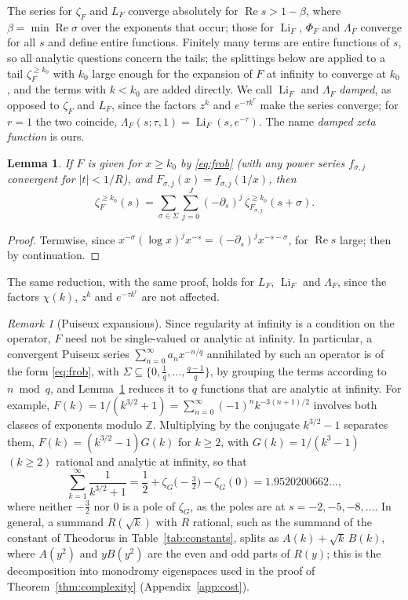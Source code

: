 \documentclass[11pt,reqno]{amsart}
\newtheorem{lemma}[theorem]{Lemma}
\theoremstyle{definition}
\theoremstyle{remark}
\newtheorem{remark}[theorem]{Remark}
\newcommand{\Li}{\operatorname{Li}}
\newcommand{\ZZ}{\mathbb{Z}}
\begin{document}
The series for $\zeta_F$ and $L_F$ converge absolutely for $\operatorname{Re}s > 1 - \beta$, where
$\beta = \min\operatorname{Re}\sigma$ over the exponents that occur; those for $\Li_F$, $\Phi_F$ and $\Lambda_F$
converge for all $s$ and define entire functions. Finitely many terms are entire functions of $s$, so all
analytic questions concern the tails; the splittings below are applied to a tail $\zeta_F^{\ge k_0}$ with $k_0$ large
enough for the expansion of $F$ at infinity to converge at $k_0$, and the terms with $k < k_0$ are added directly. We call $\Li_F$ and $\Lambda_F$ \emph{damped}, as opposed to
$\zeta_F$ and $L_F$, since the factors $z^k$ and $e^{-\tau k^r}$ make the series converge; for $r = 1$ the two
coincide, $\Lambda_F(s;\tau,1) = \Li_F(s,e^{-\tau})$. The name \emph{damped zeta function} is ours.

\begin{lemma}\label{lem:reduction}
If $F$ is given for $x \ge k_0$ by \eqref{eq:frob} (with any power series $f_{\sigma,j}$ convergent for
$|t| < 1/R$), and $F_{\sigma,j}(x) = f_{\sigma,j}(1/x)$, then
\[
  \zeta_F^{\ge k_0}(s) = \sum_{\sigma\in\Sigma}\sum_{j=0}^{J}(-\partial_s)^j\,\zeta_{F_{\sigma,j}}^{\ge k_0}(s+\sigma).
\]
\end{lemma}

\begin{proof}
Termwise, since $x^{-\sigma}(\log x)^jx^{-s} = (-\partial_s)^jx^{-s-\sigma}$, for $\operatorname{Re}s$ large; then by
continuation.
\end{proof}

The same reduction, with the same proof, holds for $L_F$, $\Li_F$ and $\Lambda_F$, since the factors $\chi(k)$, $z^k$
and $e^{-\tau k^r}$ are not affected.

\begin{remark}[Puiseux expansions]\label{rem:puiseux}
Since regularity at infinity is a condition on the operator, $F$ need not be single-valued or analytic at
infinity. In particular, a convergent Puiseux series $\sum_{n=0}^{\infty}a_nx^{-n/q}$
annihilated by such an operator is of the form \eqref{eq:frob}, with $\Sigma \subseteq \{0, \frac1q, \dots,
\frac{q-1}q\}$, by grouping the terms according to $n \bmod q$, and Lemma~\ref{lem:reduction} reduces it to $q$
functions that are analytic at infinity. For example, $F(k) = 1/(k^{3/2}+1) = \sum_{n=0}^{\infty}(-1)^nk^{-3(n+1)/2}$
involves both classes of exponents modulo $\ZZ$. Multiplying by the conjugate $k^{3/2}-1$ separates them,
$F(k) = (k^{3/2}-1)G(k)$ for $k \ge 2$, with $G(k) = 1/(k^3-1)$ $(k \ge 2)$ rational and analytic at infinity, so that
\[
  \sum_{k=1}^{\infty}\frac{1}{k^{3/2}+1} = \frac12 + \zeta_G\bigl(-\tfrac32\bigr) - \zeta_G(0) = 1.9520200662\ldots,
\]
where neither $-\frac32$ nor $0$ is a pole of $\zeta_G$, as the poles are at $s = -2, -5, -8, \dots$. In general, a summand
$R(\sqrt k)$ with $R$ rational, such as the summand of the constant of Theodorus in Table~\ref{tab:constants}, splits as $A(k) + \sqrt k\,B(k)$, where $A(y^2)$ and $yB(y^2)$ are the even and odd
parts of $R(y)$; this is the decomposition into monodromy eigenspaces used in the proof of
Theorem~\ref{thm:complexity} (Appendix~\ref{app:cost}).
\end{remark}
\end{document}
